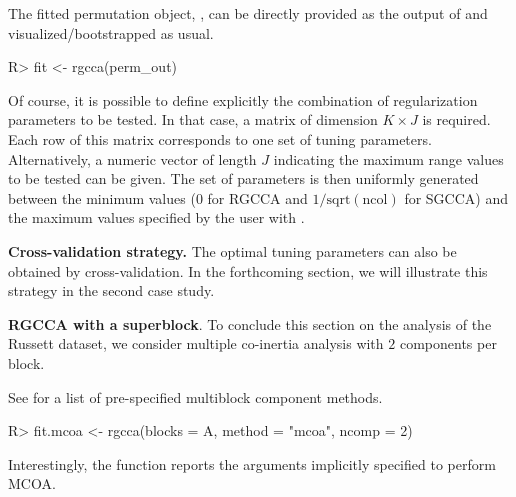 \documentclass[
]{jss}
\begin{document}
\normalsize

The fitted permutation object, , can be directly
provided as the output of  and visualized/bootstrapped as
usual.

\footnotesize

\begin{CodeChunk}
\begin{CodeInput}
R> fit <- rgcca(perm_out)
\end{CodeInput}
\end{CodeChunk}

\normalsize

Of course, it is possible to define explicitly the combination of
regularization parameters to be tested. In that case, a matrix of
dimension \(K \times J\) is required. Each row of this matrix
corresponds to one set of tuning parameters. Alternatively, a numeric
vector of length \(J\) indicating the maximum range values to be tested
can be given. The set of parameters is then uniformly generated between
the minimum values (0 for RGCCA and \(1/\text{sqrt}(\text{ncol})\) for
SGCCA) and the maximum values specified by the user with
.

\textbf{Cross-validation strategy.} The optimal tuning parameters can
also be obtained by cross-validation. In the forthcoming section, we
will illustrate this strategy in the second case study.

\textbf{RGCCA with a superblock}. To conclude this section on the
analysis of the Russett dataset, we consider multiple co-inertia
analysis \citep{Chessel1996}
\citep[MCOA, also called MCIA in][]{Cantini2021} with \(2\) components
per block.

See  for a list of pre-specified multiblock
component methods.

\footnotesize

\begin{CodeChunk}
\begin{CodeInput}
R> fit.mcoa <- rgcca(blocks = A, method = "mcoa", ncomp = 2)
\end{CodeInput}
\end{CodeChunk}

\normalsize

Interestingly, the  function reports the arguments
implicitly specified to perform MCOA.

\footnotesize
\end{document}
